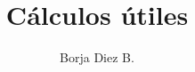 \documentclass[a4paper,11pt]{article}
\title{\boldmath Cálculos útiles}
\author{Borja Diez B.}
\affiliation{Universidad Arturo Pratt, Iquique, Chile}
\theoremstyle{definition}
\begin{document}
\maketitle
\flushbottom


\newpage
%


\newpage


\end{document}
